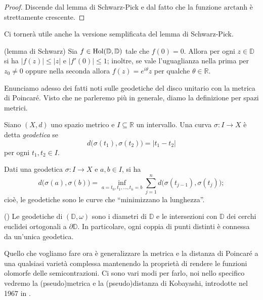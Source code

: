 \begin{proof}
    Discende dal lemma di Schwarz-Pick e dal fatto che la funzione $\text{arctanh}$ è strettamente crescente.
\end{proof}

Ci tornerà utile anche la versione semplificata del lemma di Schwarz-Pick.

\begin{lm}
    (lemma di Schwarz) Sia $f\in\textnormal{Hol}(\mathbb{D},\mathbb{D})$ tale che $f(0)=0$. Allora per ogni $z\in\mathbb{D}$ si ha $|f(z)| \le |z|$ e $|f'(0)| \le 1$; inoltre, se vale l'uguaglianza nella prima per $z_0\not=0$ oppure nella seconda allora $f(z)=e^{i\theta}z$ per qualche $\theta\in\mathbb{R}$.
\end{lm}

Enunciamo adesso dei fatti noti sulle geodetiche del disco unitario con la metrica di Poincaré. Visto che ne parleremo più in generale, diamo la definizione per spazi metrici.

\begin{defn}
    Siano $(X,d)$ uno spazio metrico e $I\subseteq\mathbb{R}$ un intervallo. Una curva $\sigma:I\longrightarrow X$ è detta \textit{geodetica} se
    $$d\big(\sigma(t_1),\sigma(t_2)\big)=|t_1-t_2|$$
    per ogni $t_1,t_2\in I$.
\end{defn}

\begin{oss}
    Dati una geodetica $\sigma:I\longrightarrow X$ e $a,b\in I$, si ha
    $$d\big(\sigma(a),\sigma(b)\big)=\inf_{a=t_0,t_1,\dots,t_n=b} \sum_{j=1}^n d\big(\sigma(t_{j-1}),\sigma(t_j)\big);$$
    cioè, le geodetiche sono le curve che ``minimizzano la lunghezza''.
\end{oss}

\begin{prop}
    (\cite[point (iv) of Proposition 1.2.7]{A5}) Le geodetiche di $(\mathbb{D},\omega)$ sono i diametri di $\mathbb{D}$ e le intersezioni con $\mathbb{D}$ dei cerchi euclidei ortogonali a $\partial\mathbb{D}$. In particolare, ogni coppia di punti distinti è connessa da un'unica geodetica.
\end{prop}

Quello che vogliamo fare ora è generalizzare la metrica e la distanza di Poincaré a una qualsiasi varietà complessa mantenendo la proprietà di rendere le funzioni olomorfe delle semicontrazioni. Ci sono vari modi per farlo, noi nello specifico vedremo la (pseudo)metrica e la (pseudo)distanza di Kobayashi, introdotte nel 1967 in \cite{Ko1}.

